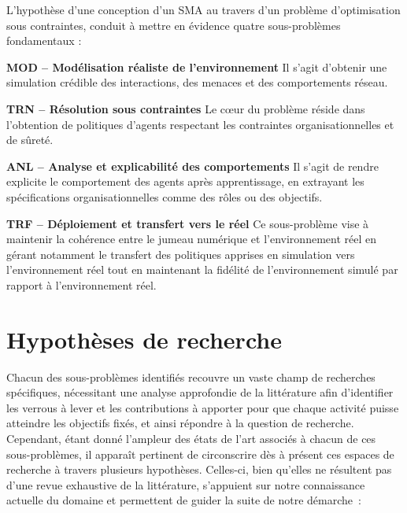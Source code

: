 L'hypothèse d'une conception d'un SMA au travers d'un problème d'optimisation sous contraintes, conduit à mettre en évidence quatre sous-problèmes fondamentaux :

\medskip
\noindent
\textbf{MOD -- Modélisation réaliste de l'environnement}
Il s'agit d'obtenir une simulation crédible des interactions, des menaces et des comportements réseau.

\medskip
\noindent
\textbf{TRN -- Résolution sous contraintes}
Le cœur du problème réside dans l'obtention de politiques d'agents respectant les contraintes organisationnelles et de sûreté.

\medskip
\noindent
\textbf{ANL -- Analyse et explicabilité des comportements}
Il s'agit de rendre explicite le comportement des agents après apprentissage, en extrayant les spécifications organisationnelles comme des rôles ou des objectifs.

\medskip
\noindent
\textbf{TRF -- Déploiement et transfert vers le réel}
Ce sous-problème vise à maintenir la cohérence entre le jumeau numérique et l'environnement réel en gérant notamment le transfert des politiques apprises en simulation vers l'environnement réel tout en maintenant la fidélité de l'environnement simulé par rapport à l'environnement réel.

\clearpage

\section{Hypothèses de recherche}

Chacun des sous-problèmes identifiés recouvre un vaste champ de recherches spécifiques, nécessitant une analyse approfondie de la littérature afin d'identifier les verrous à lever et les contributions à apporter pour que chaque activité puisse atteindre les objectifs fixés, et ainsi répondre à la question de recherche. Cependant, étant donné l'ampleur des états de l'art associés à chacun de ces sous-problèmes, il apparaît pertinent de circonscrire dès à présent ces espaces de recherche à travers plusieurs hypothèses. Celles-ci, bien qu'elles ne résultent pas d'une revue exhaustive de la littérature, s'appuient sur notre connaissance actuelle du domaine et permettent de guider la suite de notre démarche~:

